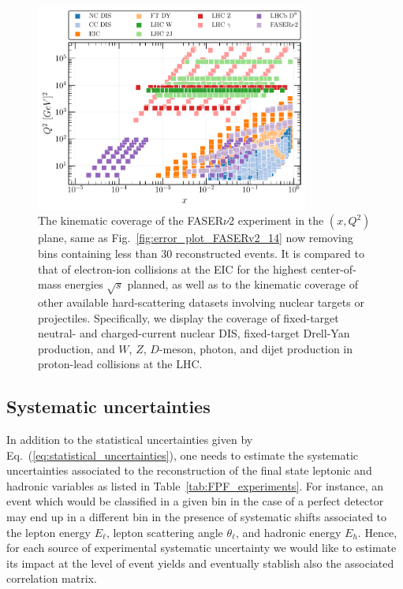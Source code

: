 \begin{figure}[h]
    \centering
    \includegraphics[width = 0.8\textwidth]{plots/Kin_nNNPDF30_EIC_FPF.pdf}
    \caption{The kinematic coverage of the FASER$\nu$2 experiment in the $(x,Q^2)$ plane,
      same as  Fig.~\ref{fig:error_plot_FASERv2_14} now removing bins
      containing less than 30 reconstructed events.
      It is compared to that of electron-ion collisions
      at the EIC for the highest center-of-mass energies $\sqrt{s}$ planned,
      as well as to the kinematic coverage of other available hard-scattering datasets involving
      nuclear targets or projectiles.
      Specifically, we display the coverage of fixed-target neutral- and charged-current nuclear DIS,
      fixed-target Drell-Yan production, and $W$, $Z$, $D$-meson, photon, and dijet
      production in proton-lead collisions at the LHC.
      }
    \label{fig:Kin_nNNPDF30_EIC_FPF}
\end{figure}


\subsection{Systematic uncertainties}
\label{sec:systematic_uncertainties}

In addition to the statistical uncertainties given by Eq.~(\ref{eq:statistical_uncertainties}),
one needs to estimate the systematic uncertainties associated to the reconstruction
of the final state leptonic and hadronic variables as listed in Table~\ref{tab:FPF_experiments}.
%
For instance, an event which would be classified in a given bin in the case
of a perfect detector may end up in a different bin in the presence of systematic
shifts associated to the lepton energy $E_\ell$, lepton scattering angle $\theta_\ell$, and
hadronic energy $E_h$.
%
Hence, for each source of experimental systematic uncertainty we would like to estimate
its impact at the level of event yields and eventually stablish also the associated
correlation matrix.

